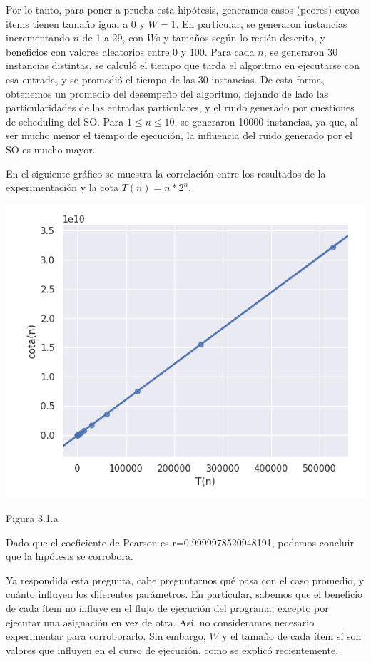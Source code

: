 \documentclass[a4paper]{article}
\begin{document}
Por lo tanto, para poner a prueba esta hipótesis, generamos casos (peores) cuyos items tienen tamaño igual a 0 y $W = 1$. En particular, se generaron instancias incrementando $n$ de 1 a 29, con $W$s y tamaños según lo recién descrito, y beneficios con valores aleatorios entre 0 y 100. Para cada $n$, se generaron 30 instancias distintas, se calculó el tiempo que tarda el algoritmo en ejecutarse con esa entrada, y se promedió el tiempo de las 30 instancias. De esta forma, obtenemos un promedio del desempeño del algoritmo, dejando de lado las particularidades de las entradas particulares, y el ruido generado por cuestiones de scheduling del SO. Para $1 \leq n \leq 10 $, se generaron 10000 instancias, ya que, al ser mucho menor el tiempo de ejecución, la influencia del ruido generado por el SO es mucho mayor. 

En el siguiente gráfico se muestra la correlación entre los resultados de la experimentación y la cota $T(n) = n * 2^n $.

\begin{center}
    \includegraphics[scale=0.7]{FBcorrelacConCota.png}
    
    
	\caption{Figura 3.1.a  }
  \end{center}

Dado que el coeficiente de Pearson es r=0.9999978520948191, podemos concluir que la hipótesis se corrobora.

Ya respondida esta pregunta, cabe preguntarnos qué pasa con el caso promedio, y cuánto influyen los diferentes parámetros. En particular, sabemos que el beneficio de cada ítem no influye en el flujo de ejecución del programa, excepto por ejecutar una asignación en vez de otra. Así, no consideramos necesario experimentar para corroborarlo. Sin embargo, $W$ y el tamaño de cada ítem sí son valores que influyen en el curso de ejecución, como se explicó recientemente. 
\end{document}
